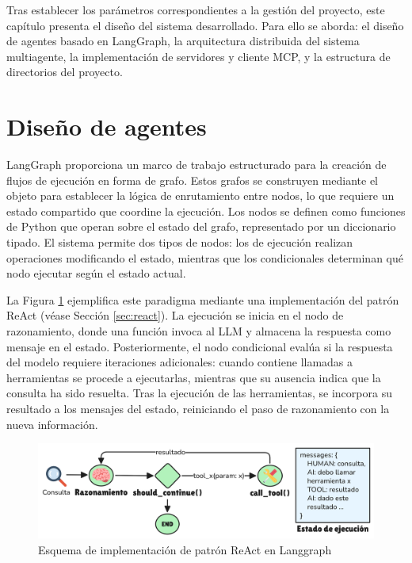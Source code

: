 Tras establecer los parámetros correspondientes a la gestión del proyecto, este capítulo presenta el diseño del sistema desarrollado. Para ello se aborda: el diseño de agentes basado en LangGraph, la arquitectura distribuida del sistema multiagente, la implementación de servidores y cliente MCP, y la estructura de directorios del proyecto.

\section{Diseño de agentes}
LangGraph proporciona un marco de trabajo estructurado para la creación de flujos de ejecución en forma de grafo. Estos grafos se construyen mediante el objeto  para establecer la lógica de enrutamiento entre nodos, lo que requiere un estado compartido que coordine la ejecución. Los nodos se definen como funciones de Python que operan sobre el estado del grafo, representado por un diccionario tipado. El sistema permite dos tipos de nodos: los de ejecución realizan operaciones modificando el estado, mientras que los condicionales determinan qué nodo ejecutar según el estado actual.

La Figura \ref{fig:react} ejemplifica este paradigma mediante una implementación del patrón ReAct (véase Sección \ref{sec:react}). La ejecución se inicia en el nodo de razonamiento, donde una función invoca al LLM y almacena la respuesta como mensaje en el estado. Posteriormente, el nodo condicional  evalúa si la respuesta del modelo requiere iteraciones adicionales: cuando contiene llamadas a herramientas se procede a ejecutarlas, mientras que su ausencia indica que la consulta ha sido resuelta. Tras la ejecución de las herramientas, se incorpora su resultado a los mensajes del estado, reiniciando el paso de razonamiento con la nueva información.

\begin{figure}[hbtp]
  \centering
  \includegraphics[scale=0.2]{figures/react.png}
  \caption{Esquema de implementación de patrón ReAct en Langgraph}
  \label{fig:react}
\end{figure}

